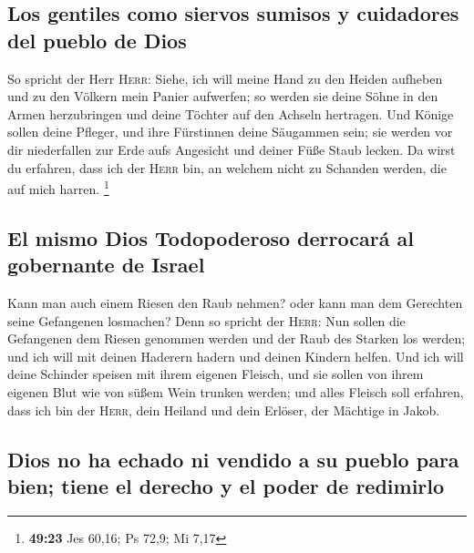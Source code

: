 \hypertarget{los-gentiles-como-siervos-sumisos-y-cuidadores-del-pueblo-de-dios}{%
\subsection{Los gentiles como siervos sumisos y cuidadores del pueblo de
Dios}\label{los-gentiles-como-siervos-sumisos-y-cuidadores-del-pueblo-de-dios}}

 So spricht der Herr \textsc{Herr}: Siehe, ich will meine
Hand zu den Heiden aufheben und zu den Völkern mein Panier aufwerfen; so
werden sie deine Söhne in den Armen herzubringen und deine Töchter auf
den Achseln hertragen.  Und Könige sollen deine Pfleger,
und ihre Fürstinnen deine Säugammen sein; sie werden vor dir
niederfallen zur Erde aufs Angesicht und deiner Füße Staub lecken. Da
wirst du erfahren, dass ich der \textsc{Herr} bin, an welchem nicht zu
Schanden werden, die auf mich harren. \footnote{\textbf{49:23} Jes
  60,16; Ps 72,9; Mi 7,17}

\hypertarget{el-mismo-dios-todopoderoso-derrocaruxe1-al-gobernante-de-israel}{%
\subsection{El mismo Dios Todopoderoso derrocará al gobernante de
Israel}\label{el-mismo-dios-todopoderoso-derrocaruxe1-al-gobernante-de-israel}}

 Kann man auch einem Riesen den Raub nehmen? oder kann
man dem Gerechten seine Gefangenen losmachen?  Denn so
spricht der \textsc{Herr}: Nun sollen die Gefangenen dem Riesen genommen
werden und der Raub des Starken los werden; und ich will mit deinen
Haderern hadern und deinen Kindern helfen.  Und ich will
deine Schinder speisen mit ihrem eigenen Fleisch, und sie sollen von
ihrem eigenen Blut wie von süßem Wein trunken werden; und alles Fleisch
soll erfahren, dass ich bin der \textsc{Herr}, dein Heiland und dein
Erlöser, der Mächtige in Jakob.

\hypertarget{dios-no-ha-echado-ni-vendido-a-su-pueblo-para-bien-tiene-el-derecho-y-el-poder-de-redimirlo}{%
\subsection{Dios no ha echado ni vendido a su pueblo para bien; tiene el
derecho y el poder de
redimirlo}\label{dios-no-ha-echado-ni-vendido-a-su-pueblo-para-bien-tiene-el-derecho-y-el-poder-de-redimirlo}}

